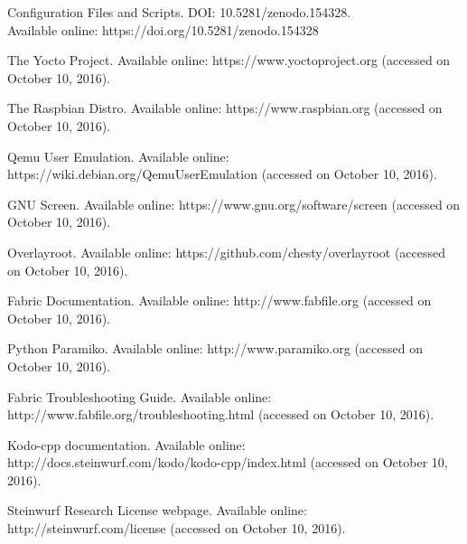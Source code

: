\documentclass[electronics,article,accept,moreauthors,pdftex,10pt,a4paper]{mdpi}
\theoremstyle{mdpi}
\newcounter{ex}
\newcounter{re}
\theoremstyle{mdpidefinition}
\begin{document}
\begin{thebibliography}{999}

  Configuration Files and Scripts.
  \newblock DOI: 10.5281/zenodo.154328.
  \newblock\\ Available online:  https://doi.org/10.5281/zenodo.154328

The Yocto Project.
\newblock  Available online: https://www.yoctoproject.org (accessed on October 10, 2016).

The Raspbian Distro.
\newblock  Available online: https://www.raspbian.org (accessed on October 10, 2016).

Qemu User Emulation.
\newblock  Available online: https://wiki.debian.org/QemuUserEmulation  (accessed on October 10, 2016).

GNU Screen.
\newblock  Available online: https://www.gnu.org/software/screen  (accessed on October 10, 2016).

Overlayroot.
\newblock  Available online: https://github.com/chesty/overlayroot  (accessed on October 10, 2016).

Fabric Documentation.
\newblock  Available online: http://www.fabfile.org (accessed on October 10, 2016).

Python Paramiko.
\newblock  Available online: http://www.paramiko.org (accessed on October 10, 2016).

Fabric Troubleshooting Guide.
\newblock  Available online: http://www.fabfile.org/troubleshooting.html (accessed on October 10, 2016).

Kodo-cpp documentation.
\newblock  Available online: http://docs.steinwurf.com/kodo/kodo-cpp/index.html (accessed on October 10, 2016).

Steinwurf Research License webpage.
\newblock  Available online: http://steinwurf.com/license (accessed on October 10, 2016).

\end{thebibliography}


%


\end{document}
